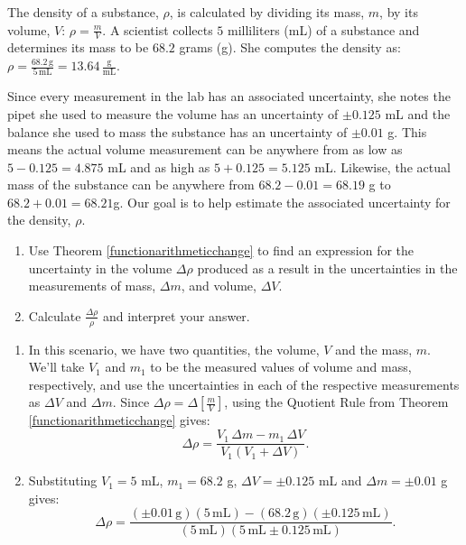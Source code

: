 \documentclass{ximera}
\begin{document}
\begin{example}\label{densityexample} The density of a substance, $\rho$, is calculated by dividing its mass, $m$, by its volume, $V$:  $\rho = \frac{m}{V}$.  A scientist collects $5$ milliliters (mL) of a substance and determines its mass to be $68.2$ grams (g).  She computes the density as:  $\rho = \frac{68.2 \, \text{g}}{5 \, \text{mL}} = 13.64 \, \frac{\text{g}}{\text{mL}}$.

Since every measurement in the lab has an associated uncertainty, she notes the pipet she used to measure the volume has an uncertainty of  $\pm 0.125$ mL and the balance she used to mass the substance has an uncertainty of  $\pm 0.01$ g.  This means the actual volume measurement can be anywhere from as low as  $5 - 0.125 = 4.875$ mL and as high as $5 + 0.125 = 5.125$ mL.  Likewise, the actual mass of the substance can be anywhere from $68.2 - 0.01 = 68.19$ g to $68.2+ 0.01 = 68.21$g.  Our goal is to help estimate the associated uncertainty  for the density, $\rho$.

\begin{enumerate}

\item Use Theorem \ref{functionarithmeticchange} to find an expression for the uncertainty in the volume $\Delta \rho$ produced as a result in the uncertainties in the measurements of mass, $\Delta m$, and volume, $\Delta V$.

\item  Calculate $\frac{\Delta \rho}{\rho}$ and interpret your answer.

\end{enumerate}

\begin{explanation}

\begin{enumerate}

\item  In this scenario, we have two quantities, the volume, $V$ and the mass, $m$.  We'll take $V_{1}$ and $m_{1}$ to be the measured values of volume and mass, respectively, and use the uncertainties in each of the respective measurements as $\Delta V$ and $\Delta m$.  Since  $\Delta \rho = \Delta \left[ \frac{m}{V}\right]$, using the Quotient Rule from Theorem \ref{functionarithmeticchange} gives: \[ \Delta \rho =  \frac{ V_{1} \, \Delta m  - m_{1} \,  \Delta V }{V_{1} (V_{1} + \Delta V) }.\]

\item Substituting $V_{1} = 5$ mL, $m_{1} = 68.2$ g, $\Delta V =  \pm 0.125$ mL  and $\Delta m = \pm 0.01$ g gives:
  \[ \Delta \rho =  \frac{ (\pm 0.01 \, \text{g})  (5 \, \text{mL})  - (68.2 \, \text{g}) (\pm 0.125 \, \text{mL})} {(5 \, \text{mL})(5 \, \text{mL}  \pm 0.125 \, \text{mL})}.\]


\end{enumerate}
\end{explanation}
\end{example}
\end{document}
